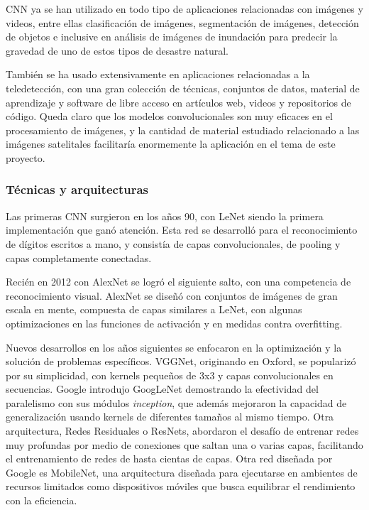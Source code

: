 CNN ya se han utilizado en todo tipo de aplicaciones relacionadas con imágenes y videos, entre ellas clasificación de
imágenes, segmentación de imágenes, detección de objetos e inclusive en análisis de imágenes de inundación para
predecir la gravedad de uno de estos tipos de desastre natural. \autocite{pally2022105285}

También se ha usado extensivamente en aplicaciones relacionadas a la teledetección, con una gran colección de técnicas,
conjuntos de datos, material de aprendizaje y software de libre acceso en artículos web, videos y repositorios de
código. \autocite{tds-landuse-classification} \autocite{repo-satellite-image-dl} Queda claro que los modelos
convolucionales son muy eficaces en el procesamiento de imágenes, y la cantidad de material estudiado relacionado a las
imágenes satelitales facilitaría enormemente la aplicación en el tema de este proyecto.

\subsubsection{Técnicas y arquitecturas}

Las primeras CNN surgieron en los años 90, con LeNet siendo la primera implementación que ganó atención. Esta red se
desarrolló para el reconocimiento de dígitos escritos a mano, y consistía de capas convolucionales, de pooling y capas
completamente conectadas.

Recién en 2012 con AlexNet se logró el siguiente salto, con una competencia de reconocimiento visual. AlexNet se diseñó
con conjuntos de imágenes de gran escala en mente, compuesta de capas similares a LeNet, con algunas optimizaciones en
las funciones de activación y en medidas contra overfitting.

Nuevos desarrollos en los años siguientes se enfocaron en la optimización y la solución de problemas específicos.
VGGNet, originando en Oxford, se popularizó por su simplicidad, con kernels pequeños de 3x3 y capas convolucionales en
secuencias. Google introdujo GoogLeNet demostrando la efectividad del paralelismo con sus módulos {\it inception}, que
además mejoraron la capacidad de generalización usando kernels de diferentes tamaños al mismo tiempo. Otra
arquitectura, Redes Residuales o ResNets, abordaron el desafío de entrenar redes muy profundas por medio de conexiones
que saltan una o varias capas, facilitando el entrenamiento de redes de hasta cientas de capas. Otra red diseñada por
Google es MobileNet, una arquitectura diseñada para ejecutarse en ambientes de recursos limitados como dispositivos
móviles que busca equilibrar el rendimiento con la eficiencia.

